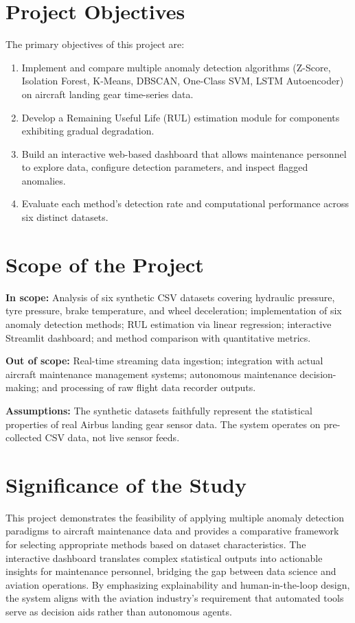 \documentclass{CLS_zhou430}
\begin{document}
\section{Project Objectives}
The primary objectives of this project are:
\begin{enumerate}
    \item Implement and compare multiple anomaly detection algorithms (Z-Score, Isolation Forest, K-Means, DBSCAN, One-Class SVM, LSTM Autoencoder) on aircraft landing gear time-series data.
    \item Develop a Remaining Useful Life (RUL) estimation module for components exhibiting gradual degradation.
    \item Build an interactive web-based dashboard that allows maintenance personnel to explore data, configure detection parameters, and inspect flagged anomalies.
    \item Evaluate each method's detection rate and computational performance across six distinct datasets.
\end{enumerate}

\section{Scope of the Project}
\textbf{In scope:} Analysis of six synthetic CSV datasets covering hydraulic pressure, tyre pressure, brake temperature, and wheel deceleration; implementation of six anomaly detection methods; RUL estimation via linear regression; interactive Streamlit dashboard; and method comparison with quantitative metrics.

\textbf{Out of scope:} Real-time streaming data ingestion; integration with actual aircraft maintenance management systems; autonomous maintenance decision-making; and processing of raw flight data recorder outputs.

\textbf{Assumptions:} The synthetic datasets faithfully represent the statistical properties of real Airbus landing gear sensor data. The system operates on pre-collected CSV data, not live sensor feeds.

\section{Significance of the Study}
This project demonstrates the feasibility of applying multiple anomaly detection paradigms to aircraft maintenance data and provides a comparative framework for selecting appropriate methods based on dataset characteristics. The interactive dashboard translates complex statistical outputs into actionable insights for maintenance personnel, bridging the gap between data science and aviation operations. By emphasizing explainability and human-in-the-loop design, the system aligns with the aviation industry's requirement that automated tools serve as decision aids rather than autonomous agents.
\end{document}
